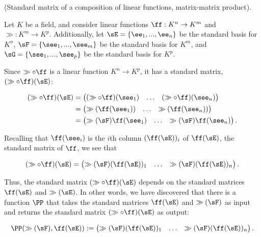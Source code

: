 \begin{deriv}
\label{ch::lin_alg::deriv::matrix_matrix_product_relative_to_bases_standard}
    (Standard matrix of a composition of linear functions, matrix-matrix product). 
    
    Let $K$ be a field, and consider linear functions $\ff:K^n \rightarrow K^m$ and $\gg:K^m \rightarrow K^p$. Additionally, let $\sE = \{\ee_1, ..., \ee_n\}$ be the standard basis for $K^n$, $\sF = \{\see_1, ..., \see_m\}$ be the standard basis for $K^m$, and $\sG = \{\see_1, ..., \see_p\}$ be the standard basis for $K^p$.
    
    Since $\gg \circ \ff$ is a linear function $K^n \rightarrow K^p$, it has a standard matrix, $(\gg \circ \ff)(\sE)$:
    
    \begin{align*}
        (\gg \circ \ff)(\sE)
        &=
        \begin{pmatrix}
            (\gg \circ \ff)(\see_1) & \hdots & (\gg \circ \ff)(\see_n)
        \end{pmatrix} \\
        &=
        \begin{pmatrix}
            \gg(\ff(\see_1)) & \hdots & \gg(\ff(\see_n))
        \end{pmatrix} \\
        &=
        \begin{pmatrix}
            \gg(\sF) \ff(\see_1) & \hdots & \gg(\sF) \ff(\see_n)
        \end{pmatrix}.
    \end{align*}
    
    Recalling that $\ff(\see_i)$ is the $i$th column $(\ff(\sE))_i$ of $\ff(\sE)$, the standard matrix of $\ff$, we see that
    
    \begin{align*}
        (\gg \circ \ff)(\sE) = 
        \begin{pmatrix} 
            \gg(\sF) (\ff(\sE))_1 & \hdots & \gg(\sF) (\ff(\sE))_n
        \end{pmatrix}.
    \end{align*}
    
    Thus, the standard matrix $(\gg \circ \ff)(\sE)$ depends on the standard matrices $\ff(\sE)$ and $\gg(\sE)$. In other words, we have discovered that there is a function $\PP$ that takes the standard matrices $\ff(\sE)$ and $\gg(\sF)$ as input and returns the standard matrix $(\gg \circ \ff)(\sE)$ as output:
    
    \begin{align*}
        \PP(\gg(\sF), \ff(\sE)) := \begin{pmatrix} 
            \gg(\sF) (\ff(\sE))_1 & \hdots & \gg(\sF) (\ff(\sE))_n
        \end{pmatrix}.
    \end{align*}
    

\end{deriv}
